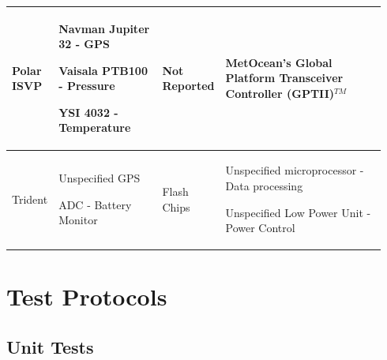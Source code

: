 \begin{longtable}{>{\RaggedRight}m{0.092\linewidth}>{\RaggedRight}m{0.284\linewidth}>{\RaggedRight}m{0.117\linewidth}>{\RaggedRight}m{0.445\linewidth}}
Polar ISVP & Navman Jupiter 32 - GPS\par{}Vaisala PTB100 - Pressure\par{}YSI 4032 - Temperature& Not Reported & MetOcean’s Global Platform Transceiver Controller (GPTII)$^{TM}$\\ \hline
Trident & Unspecified GPS\par{}ADC - Battery Monitor& Flash Chips & Unspecified microprocessor - Data processing\par{}Unspecified Low Power Unit - Power Control \\ \hline
\end{longtable}
\newpage


\chapter{Test Protocols}

\section{Unit Tests}


